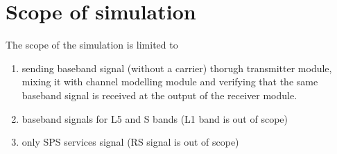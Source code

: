 \section{Scope of simulation}	
The scope of the simulation is limited to 
\begin{enumerate}
	\item sending baseband signal (without a carrier) thorugh transmitter module, mixing it with channel modelling module and verifying that the same baseband signal is received at the output of the receiver module. 
	\item baseband signals for L5 and S bands (L1 band is out of scope)
	\item only SPS services signal (RS signal is out of scope) 
\end{enumerate}



%
